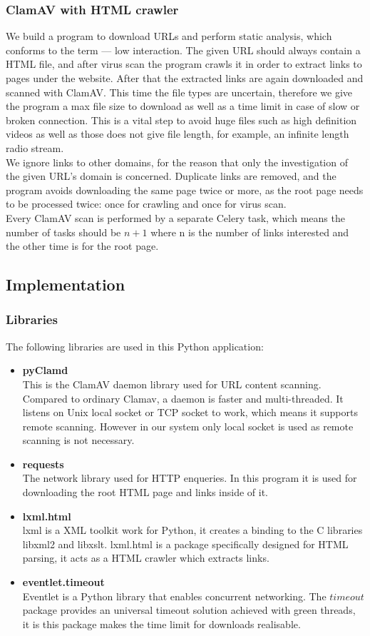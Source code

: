 \subsubsection{ClamAV with HTML crawler}
We build a program to download URLs and perform static analysis, which 
conforms to the term --- low interaction. The given URL should always contain 
a HTML file, and after virus scan the program crawls it in order to extract links to pages 
under the website. After that the extracted links are again downloaded and 
scanned with ClamAV. This time the file types are uncertain, therefore we give 
the program a max file size to download as well as a time limit in case of 
slow or broken connection. This is a vital step to avoid huge files such as 
high definition videos as well as those does not give file length, for example, an 
infinite length radio stream. \\
We ignore links to other domains, for the reason that only the investigation 
of the given URL's domain is concerned. Duplicate links are removed, and the 
program avoids downloading the same page twice or more, as the root page needs 
to be processed twice: once for crawling and once for virus scan. \\
Every ClamAV scan is performed by a separate Celery task, which means the 
number of tasks should be $n+1$ where n is the number of links interested and 
the other time is for the root page.  

\subsection{Implementation}
\subsubsection{Libraries}
The following libraries are used in this Python application:
\begin{itemize}
\item {\bf pyClamd}\\This is the ClamAV daemon library used for URL content 
scanning. Compared to ordinary Clamav, a daemon is faster and 
multi-threaded. It listens on Unix local socket or TCP socket to work, which 
means it supports remote scanning. However in our system only local socket is 
used as remote scanning is not necessary. 
\item {\bf requests}\\The network library used for HTTP enqueries. In this 
program it is used for downloading the root HTML page and links inside of it. 
\item {\bf lxml.html}\\lxml is a XML toolkit work for Python, it creates a 
binding to the C libraries libxml2 and libxslt.\cite{lxml} lxml.html is a 
package specifically designed for HTML parsing, it acts as a HTML crawler 
which extracts links. 
\item {\bf eventlet.timeout}\\Eventlet is a Python library that enables 
concurrent networking. The $timeout$ package provides an universal timeout 
solution achieved with green threads, it is this package makes the time limit 
for downloads realisable. 
\end{itemize}
